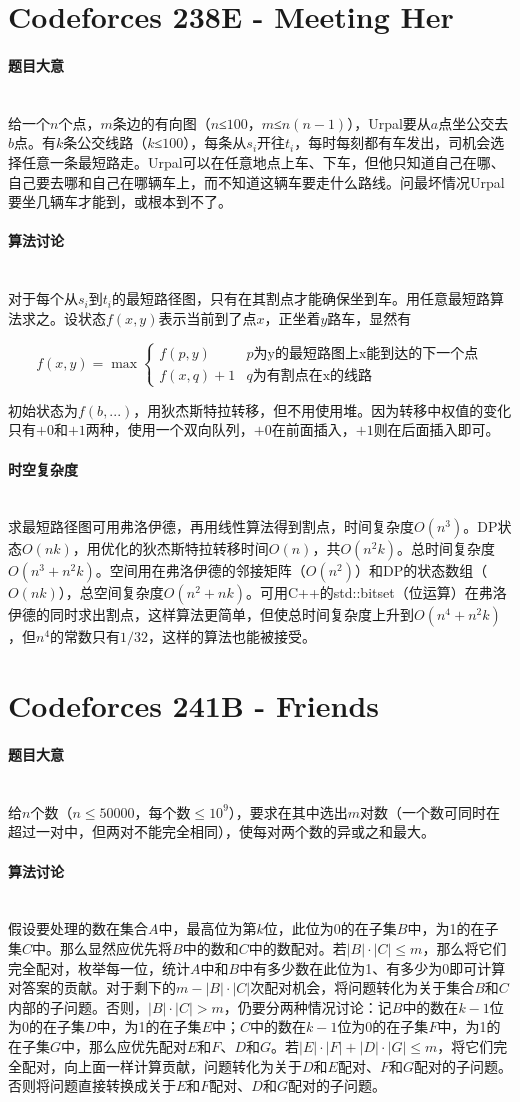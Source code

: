 \documentclass[UTF8]{ctexart}
\newcommand{\myparagraph}[1]{\paragraph{#1}\mbox{}\\}
\theoremstyle{nonumberplain}
\begin{document}
	\section{Codeforces 238E - Meeting Her}
	
		\myparagraph{题目大意}
		
			给一个$n$个点，$m$条边的有向图（$n$≤$100$，$m$≤$n(n-1)$），Urpal要从$a$点坐公交去$b$点。有$k$条公交线路（$k$≤$100$），每条从$s_i$开往$t_i$，每时每刻都有车发出，司机会选择任意一条最短路走。Urpal可以在任意地点上车、下车，但他只知道自己在哪、自己要去哪和自己在哪辆车上，而不知道这辆车要走什么路线。问最坏情况Urpal要坐几辆车才能到，或根本到不了。
		
		\myparagraph{算法讨论}
		
			对于每个从$s_i$到$t_i$的最短路径图，只有在其割点才能确保坐到车。用任意最短路算法求之。设状态$f(x,y)$表示当前到了点$x$，正坐着$y$路车，显然有
			
			$$f(x,y)=\max\left\{\begin{array}{lr}
				f(p,y) & p\mbox{为y的最短路图上x能到达的下一个点} \\
				f(x,q)+1 & q\mbox{为有割点在x的线路}
				\end{array}\right.$$
			
			初始状态为$f(b,...)$，用狄杰斯特拉转移，但不用使用堆。因为转移中权值的变化只有$+0$和$+1$两种，使用一个双向队列，$+0$在前面插入，$+1$则在后面插入即可。
		
		\myparagraph{时空复杂度}
		
			求最短路径图可用弗洛伊德，再用线性算法得到割点，时间复杂度$O(n^3)$。DP状态$O(nk)$，用优化的狄杰斯特拉转移时间$O(n)$，共$O(n^2k)$。总时间复杂度$O(n^3+n^2k)$。空间用在弗洛伊德的邻接矩阵（$O(n^2)$）和DP的状态数组（$O(nk)$），总空间复杂度$O(n^2+nk)$。可用C++的std::bitset（位运算）在弗洛伊德的同时求出割点，这样算法更简单，但使总时间复杂度上升到$O(n^4+n^2k)$，但$n^4$的常数只有$1/32$，这样的算法也能被接受。
	
	\section{Codeforces 241B - Friends}
	
		\myparagraph{题目大意}
		
			给$n$个数（$n \leq 50000$，每个数$\leq 10^9$），要求在其中选出$m$对数（一个数可同时在超过一对中，但两对不能完全相同），使每对两个数的异或之和最大。
		
		\myparagraph{算法讨论}
		
			假设要处理的数在集合$A$中，最高位为第$k$位，此位为0的在子集$B$中，为1的在子集$C$中。那么显然应优先将$B$中的数和$C$中的数配对。若$|B|\cdot|C|\leq m$，那么将它们完全配对，枚举每一位，统计$A$中和$B$中有多少数在此位为1、有多少为0即可计算对答案的贡献。对于剩下的$m-|B|\cdot|C|$次配对机会，将问题转化为关于集合$B$和$C$内部的子问题。否则，$|B|\cdot|C|>m$，仍要分两种情况讨论：记$B$中的数在$k-1$位为0的在子集$D$中，为1的在子集$E$中；$C$中的数在$k-1$位为0的在子集$F$中，为1的在子集$G$中，那么应优先配对$E$和$F$、$D$和$G$。若$|E|\cdot|F|+|D|\cdot|G|\leq m$，将它们完全配对，向上面一样计算贡献，问题转化为关于$D$和$E$配对、$F$和$G$配对的子问题。否则将问题直接转换成关于$E$和$F$配对、$D$和$G$配对的子问题。
			
\end{document}
